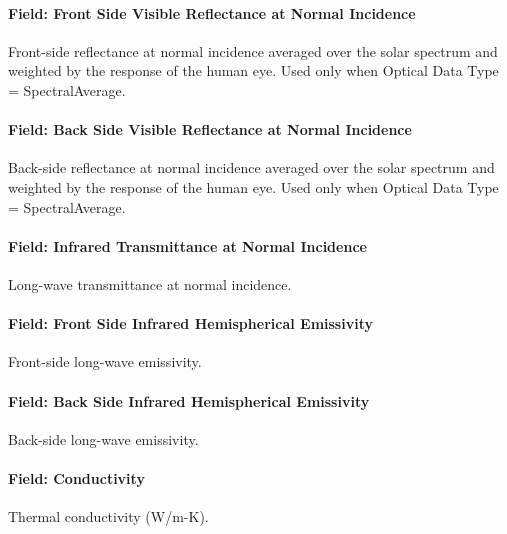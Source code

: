 \paragraph{Field: Front Side Visible Reflectance at Normal Incidence}\label{field-front-side-visible-reflectance-at-normal-incidence}

Front-side reflectance at normal incidence averaged over the solar spectrum and weighted by the response of the human eye. Used only when Optical Data Type = SpectralAverage.

\paragraph{Field: Back Side Visible Reflectance at Normal Incidence}\label{field-back-side-visible-reflectance-at-normal-incidence}

Back-side reflectance at normal incidence averaged over the solar spectrum and weighted by the response of the human eye. Used only when Optical Data Type = SpectralAverage.

\paragraph{Field: Infrared Transmittance at Normal Incidence}\label{field-infrared-transmittance-at-normal-incidence}

Long-wave transmittance at normal incidence.

\paragraph{Field: Front Side Infrared Hemispherical Emissivity}\label{field-front-side-infrared-hemispherical-emissivity}

Front-side long-wave emissivity.

\paragraph{Field: Back Side Infrared Hemispherical Emissivity}\label{field-back-side-infrared-hemispherical-emissivity}

Back-side long-wave emissivity.

\paragraph{Field: Conductivity}\label{field-conductivity-1}

Thermal conductivity (W/m-K).


